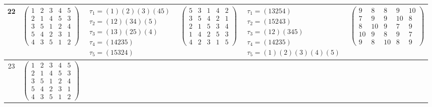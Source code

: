 \begin{longtable}{|c|p{2.7cm}|p{2.7cm}|p{2.7cm}|p{2.7cm}|p{3.3cm}|}
    \hline
    22                                                                                                                                          &
    $\begin{pmatrix}1&2&3&4&5\\2&1&4&5&3\\3&5&1&2&4\\5&4&2&3&1\\4&3&5&1&2\end{pmatrix}$                                                         &
    $\begin{array}{l}\tau_{1}=(1)(2)(3)(45)\\ \tau_{2}=(12)(34)(5)\\ \tau_{3}=(13)(25)(4)\\ \tau_{4}=(14235)\\ \tau_{5}=(15324)\end{array}$     &
    $\begin{pmatrix}5&3&1&4&2\\3&5&4&2&1\\2&1&5&3&4\\1&4&2&5&3\\4&2&3&1&5\end{pmatrix}$                                                         &
    $\begin{array}{l}\tau_{1}=(13254)\\ \tau_{2}=(15243)\\ \tau_{3}=(12)(345)\\ \tau_{4}=(14235)\\ \tau_{5}=(1)(2)(3)(4)(5)\end{array}$         &
    $\begin{pmatrix}9&8&8&9&10\\7&9&9&10&8\\8&10&9&7&9\\10&9&8&9&7\\9&8&10&8&9\end{pmatrix}$                                                                                                                                \\
    \hline
    23                                                                                                                                          &
    $\begin{pmatrix}1&2&3&4&5\\2&1&4&5&3\\3&5&1&2&4\\5&4&2&3&1\\4&3&5&1&2\end{pmatrix}$                                                         &

\end{longtable}
